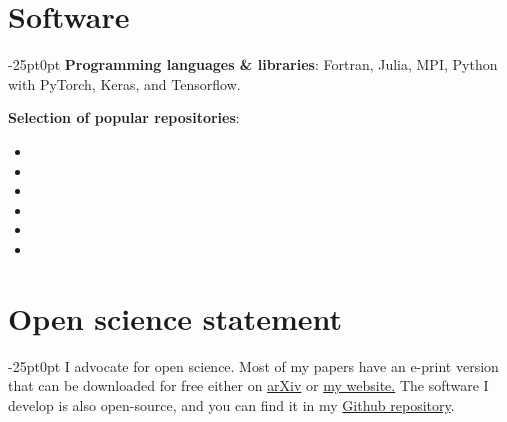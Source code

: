 \documentclass[line]{res}
\newenvironment{p11}
{\begin{adjustwidth}{-25pt}{0pt}
\vspace{8pt}}
{\end{adjustwidth}}
\begin{document}
\begin{resume}
\section{Software}
\begin{p11}
\textbf{Programming languages \& libraries}: Fortran, Julia, MPI, Python with PyTorch, Keras, and Tensorflow.

\vspace{4pt}
\textbf{Selection of popular repositories}:
\begin{itemize}
	\item {}
	\item {}
	\item {}
	\item {}
	\item {}
	\item {}
\end{itemize}
\end{p11}

\section{Open science statement}
\begin{p11}\setlength{\parskip}{3pt}
I advocate for open science.
Most of my papers have an e-print version that can be downloaded for free either on \href{https://arxiv.org/search/physics?searchtype=author&query=Font%2C+B}{arXiv} or \href{https://b-fg.github.io/_pages/publications.html}{my website.}
The software I develop is also open-source, and you can find it in my \href{https://github.com/b-fg}{Github repository}.
\end{p11}

\end{resume}
\end{document}
